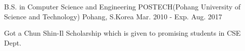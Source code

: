 

\begin{cventries}

	\cventry
	{B.S. in Computer Science and Engineering} %
	{POSTECH(Pohang University of Science and Technology)} %
	{Pohang, S.Korea} %
	{Mar. 2010 - Exp. Aug. 2017} %
	{
		\begin{cvitems} %
			\item {Got a Chun Shin-Il Scholarship which is given to promising students in CSE Dept.}
		\end{cvitems}
	}

\end{cventries}

